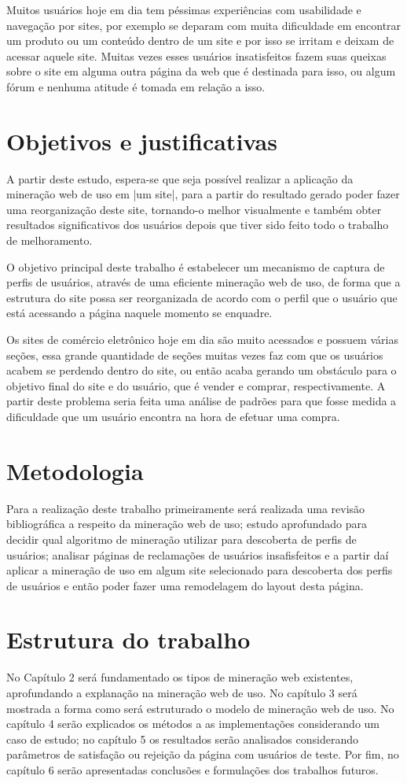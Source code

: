     Muitos usuários hoje em dia tem péssimas experiências com usabilidade e navegação por sites, por exemplo se deparam com muita dificuldade em encontrar um produto ou um conteúdo dentro de um site e por isso se irritam e deixam de acessar aquele site. Muitas vezes esses usuários insatisfeitos fazem suas queixas sobre o site em alguma outra página da web que é destinada para isso, ou algum fórum e nenhuma atitude é tomada em relação a isso.

\section{Objetivos e justificativas}

    A partir deste estudo, espera-se que seja possível realizar a aplicação da mineração web de uso em |um site|, para a partir do resultado gerado poder fazer uma reorganização deste site, tornando-o melhor visualmente e também obter resultados significativos dos usuários depois que tiver sido feito todo o trabalho de melhoramento.

    O objetivo principal deste trabalho é estabelecer um mecanismo de captura de perfis de usuários, através de uma eficiente mineração web de uso, de forma que a estrutura do site possa ser reorganizada de acordo com o perfil que o usuário que está acessando a página naquele momento se enquadre.

    Os sites de comércio eletrônico hoje em dia são muito acessados e possuem várias seções, essa grande quantidade de seções muitas vezes faz com que os usuários acabem se perdendo dentro do site, ou então acaba gerando um obstáculo para o objetivo final do site e do usuário, que é vender e comprar, respectivamente. A partir deste problema seria feita uma análise de padrões para que fosse medida a dificuldade que um usuário encontra na hora de efetuar uma compra.

\section{Metodologia}
    Para a realização deste trabalho primeiramente será realizada uma revisão bibliográfica a respeito da mineração web de uso; estudo aprofundado para decidir qual algoritmo de mineração utilizar para descoberta de perfis de usuários; analisar páginas de reclamações de usuários insafisfeitos e a partir daí aplicar a mineração de uso em algum site selecionado para descoberta dos perfis de usuários e então poder fazer uma remodelagem do layout desta página.

\section{Estrutura do trabalho}
    No Capítulo 2 será fundamentado os tipos de mineração web existentes, aprofundando a explanação na mineração web de uso. No capítulo 3 será mostrada a forma como será estruturado o modelo de mineração web de uso. No capítulo 4 serão explicados os métodos a as implementações considerando um caso de estudo; no capítulo 5 os resultados serão analisados considerando parâmetros de satisfação ou rejeição da página com usuários de teste. Por fim, no capítulo 6 serão apresentadas conclusões e formulações dos trabalhos futuros.

